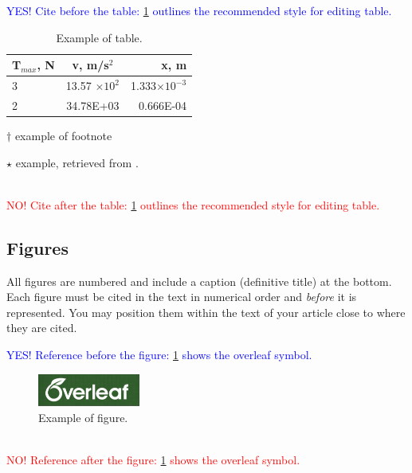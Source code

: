 \documentclass[11pt,a4paper,oneside]{article}
\begin{document}
\medskip %
\noindent \textcolor{blue}{YES! Cite before the table: \cref{tab:exampleoftable} outlines the recommended style for editing table.}
%
\begin{table}[htb]
    \centering
    \begin{threeparttable}
        \caption{\label{tab:exampleoftable}Example of table.}
        \begin{tabular}{lcr}
            \toprule
            \toprule
            T$_{max}$, N&  v, m/s$^2$& x, m\\ 
            \midrule
            3\tnote{$\dagger$}&13.57 $\times 10^{2}$& 1.333$\times 10^{-3}$\\
            2&34.78E+03& 0.666E-04\tnote{$\star$}\\
            \bottomrule
            \bottomrule
        \end{tabular}
        \begin{tablenotes}
            \footnotesize
            \item[$\dagger$] example of footnote
            \item[$\star$] example, retrieved from \cite{zhang2015low}.
        \end{tablenotes}
    \end{threeparttable}
\end{table}
%
\\
\noindent \textcolor{red}{NO! Cite after the table: \cref{tab:exampleoftable} outlines the recommended style for editing table.}

%
\subsection{Figures}\label{subsec:figures}
All figures are numbered and include a caption (definitive title) at the bottom. Each figure must be cited in the text in numerical order and \emph{before} it is represented.
You may position them within the text of your article close to where they are cited. 

\medskip
\noindent \textcolor{blue}{YES! Reference before the figure: \cref{fig:exampleoffigure} shows the overleaf symbol.}
\\
\begin{figure}[htb]
    \centering
    \includegraphics[width=0.3\textwidth]{overleaf_logo.png}
    \caption[]{\label{fig:exampleoffigure} Example of figure.}
\end{figure}
\\
\noindent \textcolor{red}{NO! Reference after the figure: \cref{fig:exampleoffigure} shows the overleaf symbol.}
\end{document}
